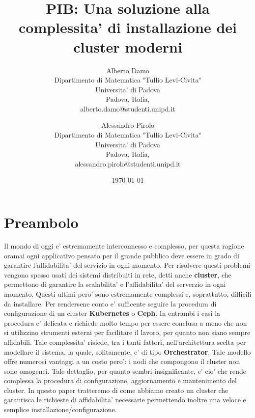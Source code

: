 \documentclass[a4paper]{article}
\newcommand{\newAuthor}[2]{#1\\
Dipartimento di Matematica "Tullio Levi-Civita"\\
Universita' di Padova \\
Padova, Italia,\\
#2
}
\begin{document}
\author{
    \newAuthor{Alberto Damo}{alberto.damo@studenti.unipd.it}\and
    \newAuthor{Alessandro Pirolo}{alessandro.pirolo@studenti.unipd.it}
}
\title{PIB: Una soluzione alla complessita' di installazione dei cluster moderni}

\date{\today}
\maketitle

\newpage
\tableofcontents
\newpage

\section{Preambolo}
Il mondo di oggi e' estremamente interconnesso e complesso, per questa ragione oramai ogni 
applicativo pensato per il grande pubblico deve essere in grado di  garantire l'affidabilita' 
del servizio in ogni momento. Per risolvere questi problemi vengono spesso usati dei sistemi
distribuiti in rete, detti anche \textbf{cluster}, che permettono di garantire la scalabilita' e
l'affidabilita' del serverzio in ogni momento. Questi ultimi pero' sono estremamente complessi e, 
soprattutto, difficili da installare. Per rendersene conto e' sufficente seguire la procedura 
di configurazione di un cluster \textbf{Kubernetes} o \textbf{Ceph}.
In entrambi i casi la procedura e' delicata e richiede molto tempo per essere conclusa a meno 
che non si utilizzino strumenti esterni per facilitare il lavoro, per quanto 
non siano sempre affidabili. Tale complessita' risiede, tra i tanti fattori, nell'architettura 
scelta per modellare il sistema, la quale, solitamente, e' di tipo \textbf{Orchestrator}. 
Tale modello offre numerosi vantaggi a un costo pero': i nodi che compongono il cluster non sono 
omogenei.
Tale dettaglio, per quanto sembri insignificante, e' cio' che rende complessa la procedura di 
configurazione, aggiornamento e mantenimento del cluster. In questo paper tratteremo di come 
abbiamo creato un cluster che garantisca le richieste di affidabilita' necessarie permettendo 
inoltre una veloce e semplice installazione/configurazione.

\newpage
\end{document}
